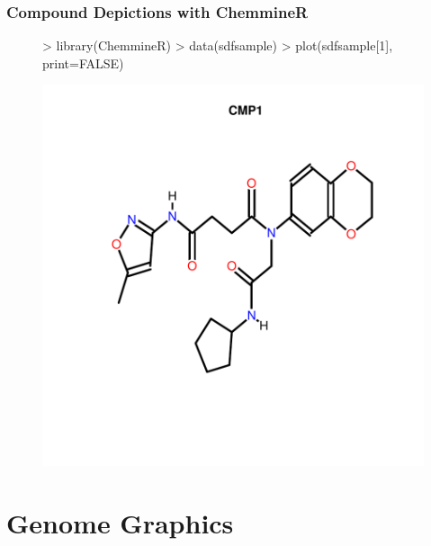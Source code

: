 \documentclass{beamer}
\begin{document}
\begin{frame}[containsverbatim]  
	\frametitle{Compound Depictions with ChemmineR}
\tiny 
\begin{figure}
  \centering
\begin{Schunk}
\begin{Sinput}
> library(ChemmineR)
> data(sdfsample)
> plot(sdfsample[1], print=FALSE)
\end{Sinput}
\end{Schunk}
\includegraphics{fig--078}
\label{fig:compounds}
\end{figure}
\end{frame}
\section{Genome Graphics}
\end{document}
